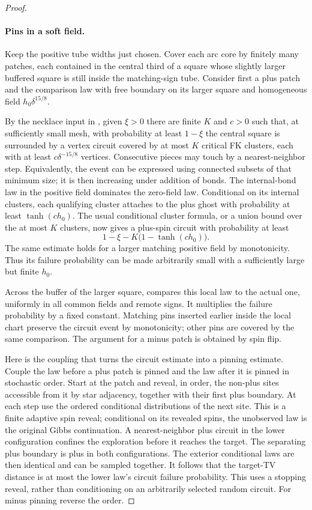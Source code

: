 \begin{proof}
\paragraph{Pins in a soft field.}
Keep the positive tube widths just chosen.  Cover each arc core by
finitely many patches, each contained in the central third of a
square whose slightly larger buffered square is still inside the
matching-sign tube.  Consider first a plus patch and the comparison
law with free boundary on its larger square and homogeneous field
$h_0\delta^{15/8}$.

By the necklace input in , given $\xi>0$ there are
finite $K$ and $c>0$ such that, at sufficiently small mesh, with
probability at least $1-\xi$ the central square is surrounded by a
vertex circuit covered by at most $K$ critical FK clusters, each with
at least $c\delta^{-15/8}$ vertices.  Consecutive pieces may touch by
a nearest-neighbor step.  Equivalently, the event can be expressed
using connected subsets of that minimum size; it is then increasing
under addition of bonds.  The internal-bond law in the positive field
dominates the zero-field law.  Conditional on its internal clusters,
each qualifying cluster attaches to the plus ghost with probability
at least $\tanh(c h_0)$.  The usual conditional cluster formula, or
a union bound over the at most $K$ clusters, now gives a plus-spin
circuit with probability at least
\begin{equation}
 1-\xi-K\bigl(1-\tanh(c h_0)\bigr).
 \label{buf:necklace-plus}
\end{equation}
The same estimate holds for a larger matching positive field by
monotonicity.  Thus its failure probability can be made arbitrarily
small with a sufficiently large but finite $h_0$.

Across the buffer of the larger square,  compares this
local law to the actual one, uniformly in all common fields and
remote signs.  It multiplies the failure probability by a fixed
constant.  Matching pins inserted earlier inside the local chart
preserve the circuit event by monotonicity; other pins are covered by
the same comparison.  The argument for a minus patch is obtained by
spin flip.

Here is the coupling that turns the circuit estimate into a pinning
estimate.  Couple the law before a plus patch is pinned and the law
after it is pinned in stochastic order.  Start at the patch and
reveal, in order, the non-plus sites accessible from it by star
adjacency, together with their first plus boundary.  At each step
use the ordered conditional distributions of the next site.  This
is a finite adaptive spin reveal; conditional on its revealed spins,
the unobserved law is the original Gibbs continuation.  A
nearest-neighbor plus circuit in the lower configuration confines
the exploration before it reaches the target.  The separating plus
boundary is plus in both configurations.  The exterior conditional
laws are then identical and can be sampled together.  It follows
that the target-TV distance is at most the lower law's circuit
failure probability.  This uses a stopping reveal, rather than
conditioning on an arbitrarily selected random circuit.  For minus
pinning reverse the order.


\end{proof}
